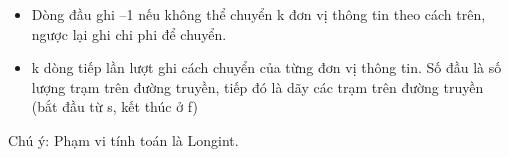 \begin{itemize}
	\item Dòng đầu ghi –1 nếu không thể chuyển k đơn vị thông tin theo cách trên, ngược lại ghi chi phi để chuyển.
	\item k dòng tiếp lần lượt ghi cách chuyển của từng đơn vị thông tin. Số đầu là số lượng trạm trên đường truyền, tiếp đó là dãy các trạm trên đường truyền (bắt đầu từ s, kết thúc ở f)
\end{itemize}

Chú ý: Phạm vi tính toán là Longint.
